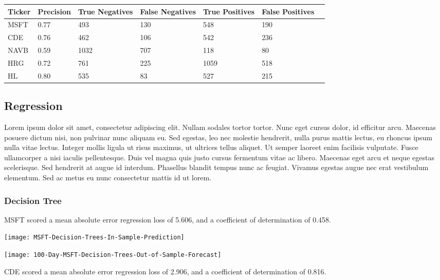 \begin{center}
    \begin{tabular}{ | l | l | l | | l | l | l | p{5cm} |}
    \hline
    Ticker & Precision & True Negatives & False Negatives & True Positives & False Positives \\ \hline
    MSFT & 0.77 & 493 & 130 & 548 & 190 \\ \hline
    CDE & 0.76 & 462 & 106 & 542 & 236 \\ \hline
    NAVB & 0.59 & 1032 & 707 & 118 & 80 \\ \hline
    HRG & 0.72 & 761 & 225 & 1059 & 518 \\ \hline
    HL & 0.80 & 535 & 83 & 527 & 215 \\
    \hline
    \end{tabular}
\end{center}

\subsection{Regression}
Lorem ipsum dolor sit amet, consectetur adipiscing elit. Nullam sodales tortor tortor. Nunc eget cursus dolor, id efficitur arcu. Maecenas posuere dictum nisi, non pulvinar nunc aliquam eu. Sed egestas, leo nec molestie hendrerit, nulla purus mattis lectus, eu rhoncus ipsum nulla vitae lectus. Integer mollis ligula ut risus maximus, ut ultrices tellus aliquet. Ut semper laoreet enim facilisis vulputate. Fusce ullamcorper a nisi iaculis pellentesque. Duis vel magna quis justo cursus fermentum vitae ac libero. Maecenas eget arcu et neque egestas scelerisque. Sed hendrerit at augue id interdum. Phasellus blandit tempus nunc ac feugiat. Vivamus egestas augue nec erat vestibulum elementum. Sed ac metus eu nunc consectetur mattis id ut lorem.

\subsubsection{Decision Tree}
MSFT scored a mean absolute error regression loss of 5.606, and a coefficient of determination of 0.458.

\texttt{[image: MSFT-Decision-Trees-In-Sample-Prediction]}

\texttt{[image: 100-Day-MSFT-Decision-Trees-Out-of-Sample-Forecast]}

CDE scored a mean absolute error regression loss of 2.906, and a coefficient of determination of 0.816.

